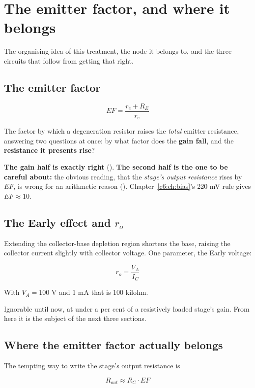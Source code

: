 
\section{The emitter factor, and where it belongs}
\label{c7:app:b}

The organising idea of this treatment, the node it belongs to, and the three circuits that follow from getting that right.

\subsection{The emitter factor}
\label{c7:sec:b1}
\[
  EF = \frac{r_e + R_E}{r_e}
\]

The factor by which a degeneration resistor raises the \emph{total} emitter resistance, answering two questions at once: by what factor does the \textbf{gain fall}, and the \textbf{resistance it presents rise}?

\textbf{The gain half is exactly right} (). \textbf{The second half is the one to be careful about:} the obvious reading, that the \emph{stage's output resistance} rises by $EF$, is wrong for an arithmetic reason (). Chapter~\ref{c6:ch:bias}'s 220 mV rule gives $EF \approx 10$.

\subsection{The Early effect and $r_o$}
\label{c7:sec:b2}
Extending the collector-base depletion region shortens the base, raising the collector current slightly with collector voltage. One parameter, the Early voltage:

\[
  r_o = \frac{V_A}{I_C}
\]

With $V_A = 100$ V and 1 mA that is 100 kilohm.

Ignorable until now, at under a per cent of a resistively loaded stage's gain. From here it is the subject of the next three sections.

\subsection{Where the emitter factor actually belongs}
\label{c7:sec:b3}
The tempting way to write the stage's output resistance is

\[
  R_{out} \approx R_C \cdot EF
\]

